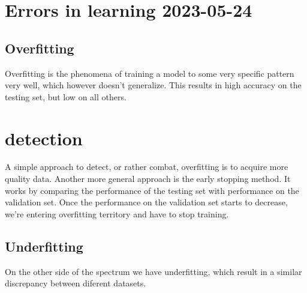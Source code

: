 
\section{Errors in learning 2023-05-24}
\subsection{Overfitting}
Overfitting is the phenomena of training a model to some very specific pattern very well, which however doesn't
generalize. This results in high accuracy on the testing set, but low on all others. 
\section{detection}
A simple approach to detect, or rather combat, overfitting is to acquire more quality data.
Another more general approach is the early stopping method. It works by comparing the performance of the testing set
with performance on the validation set. Once the performance on the validation set starts to decrease, we're entering
overfitting territory and have to stop training.
\subsection{Underfitting}
On the other side of the spectrum we have underfitting, which result in a similar discrepancy between diferent
datasets.

